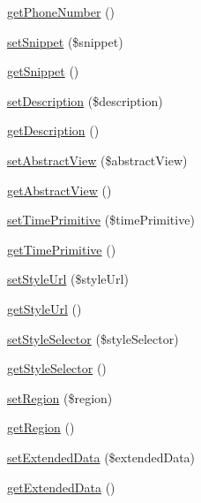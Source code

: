 \begin{DoxyCompactItemize}
\item 
\hyperlink{classFeature_ab3231780035528bf1f5d7a045f7a96e2}{getPhoneNumber} ()
\item 
\hyperlink{classFeature_ae4eab7a245ddbe6af1308a4887cd33ea}{setSnippet} (\$snippet)
\item 
\hyperlink{classFeature_a0b572f137dd3c6b2eeabcc09f0058848}{getSnippet} ()
\item 
\hyperlink{classFeature_a15e69cacfe59295974cf7bda19eb3052}{setDescription} (\$description)
\item 
\hyperlink{classFeature_a72e22a8b110daba84cab1e06ff69da73}{getDescription} ()
\item 
\hyperlink{classFeature_a2a972193bb4117515513b30f99ce46ca}{setAbstractView} (\$abstractView)
\item 
\hyperlink{classFeature_a288e654dce20d49aa7d0dd59fae9eb28}{getAbstractView} ()
\item 
\hyperlink{classFeature_a379553d80ee9fce1742d89c6b6929b24}{setTimePrimitive} (\$timePrimitive)
\item 
\hyperlink{classFeature_a415c99cc750f96183bdfeae7b245b4c7}{getTimePrimitive} ()
\item 
\hyperlink{classFeature_a192d44bc9a22166cc2288dd7b45a30fb}{setStyleUrl} (\$styleUrl)
\item 
\hyperlink{classFeature_ad322275fe20abaa64fa6d33d2fa5664f}{getStyleUrl} ()
\item 
\hyperlink{classFeature_a81d9281a82c1a8d5b24d549da9f6bb3e}{setStyleSelector} (\$styleSelector)
\item 
\hyperlink{classFeature_af7b0b42e5dd5a2b0257bc7cfb4d18a72}{getStyleSelector} ()
\item 
\hyperlink{classFeature_a5004dec02433339ca95a9728c0d22df3}{setRegion} (\$region)
\item 
\hyperlink{classFeature_ae49a1ed973ae503b4c413e78a3708234}{getRegion} ()
\item 
\hyperlink{classFeature_ac13c5fe723c718c860bcf4216adad6e3}{setExtendedData} (\$extendedData)
\item 
\hyperlink{classFeature_a0f51fb450704f4f92c8b840fe5aabc2e}{getExtendedData} ()
\end{DoxyCompactItemize}
